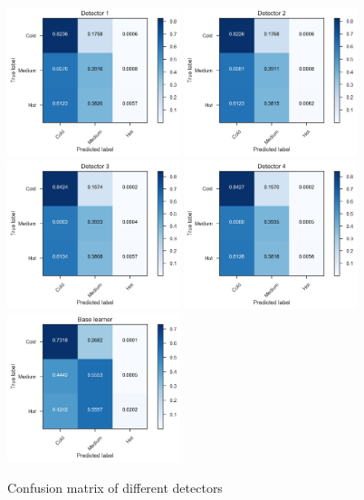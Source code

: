 \begin{figure}
\centering
\includegraphics[width=0.45\textwidth]{drift_cm_Detector1.png}
\includegraphics[width=0.45\textwidth]{drift_cm_Detector2.png}
\includegraphics[width=0.45\textwidth]{drift_cm_Detector3.png}
\includegraphics[width=0.45\textwidth]{drift_cm_Detector4.png}
\includegraphics[width=0.45\textwidth]{drift_cm_Baselearner.png}
\caption{Confusion matrix of different detectors}
\label{drift_cm}
\end{figure}

